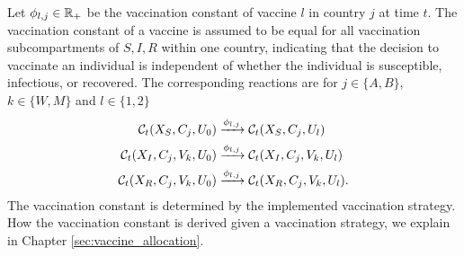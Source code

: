 Let $\phi_{l,j} \in \mathbb{R}_+$ be the vaccination constant of vaccine $l$ in country $j$ at time $t$. The vaccination constant of a vaccine is assumed to be equal for all vaccination subcompartments of $S, I,R$ within one country, indicating that the decision to vaccinate an individual is independent of whether the individual is susceptible, infectious, or recovered.  The corresponding reactions are for $j \in \{A,B\}$, $k \in \{W,M\}$ and $l \in \{1,2\}$
\begin{align}
\mathcal{C}_t(X_S, C_j, U_0) &\xrightarrow{\phi_{l, j}} \mathcal{C}_t(X_S, C_j, U_l)  \\
\mathcal{C}_t(X_I, C_j, V_k, U_0) &\xrightarrow{\phi_{l,j}} \mathcal{C}_t(X_I, C_j, V_k, U_l) \notag \\
\mathcal{C}_t(X_R, C_j, V_k, U_0) &\xrightarrow{\phi_{l,j}} \mathcal{C}_t(X_R, C_j, V_k, U_l). \notag
\end{align}
The vaccination constant is determined by the implemented vaccination strategy. How the vaccination constant is derived given a vaccination strategy, we explain in Chapter \ref{sec:vaccine_allocation}.


